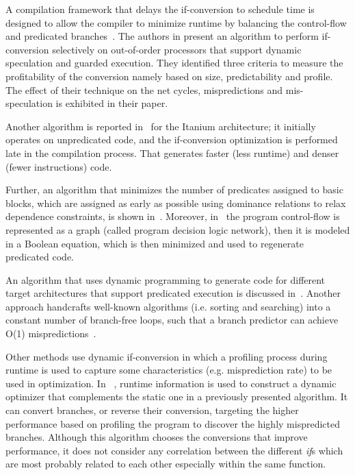 \documentclass[preprint,nocopyrightspace]{sigplanconf}
\begin{document}
A compilation framework that delays the if-conversion to schedule time is designed to allow the compiler to minimize runtime by balancing the control-flow and predicated branches~\cite{645801}. 
The authors in \cite{Mantripragada:2000} present an algorithm to perform if-conversion selectively on out-of-order processors that support dynamic speculation and guarded execution. They identified three criteria to measure the profitability of the conversion namely based on size, predictability and profile. The effect of their technique on the net cycles, mispredictions and mis-speculation is exhibited in their paper. 

Another algorithm is reported in~\cite{Snavely02} for the Itanium architecture; it initially operates on unpredicated code, and the if-conversion optimization is performed late in the compilation process. That generates faster (less runtime) and denser (fewer instructions) code. 

Further, an algorithm that minimizes the number of predicates assigned to basic blocks, which are assigned as early as possible using dominance relations to relax dependence constraints, is shown in~\cite{63091}.
Moreover, in~\cite{765952} the program control-flow is represented as a graph (called program decision logic network), then it is modeled in a Boolean equation, which is then minimized and used to regenerate predicated code.

An algorithm that uses dynamic programming to generate code for different target architectures that support predicated execution is discussed in~\cite{hohenauer2008retargetable}.
Another approach handcrafts well-known algorithms (i.e. sorting and searching) into a constant number of branch-free loops, such that a branch predictor can achieve O(1) mispredictions~\cite{aj12}.

Other methods use dynamic if-conversion in which a profiling process during runtime is used to capture some characteristics (e.g. misprediction rate) to be used in optimization.
In ~\cite{hazelwood2000lightweight}, runtime information is used to construct a dynamic optimizer that complements the static one in a previously presented algorithm. It can convert branches, or reverse their conversion, targeting the higher performance based on profiling the program to discover the highly mispredicted branches. Although this algorithm chooses the conversions that improve performance, it does not consider any correlation between the different \textit{if}s which are most probably related to each other especially within the same function.
\end{document}
